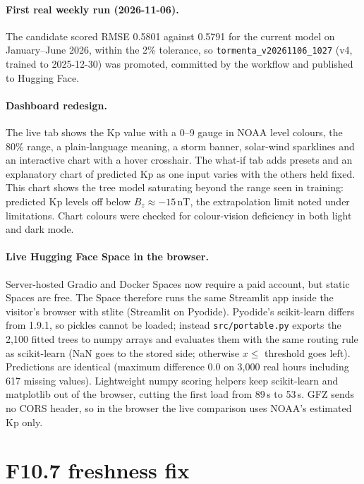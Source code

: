 \documentclass[11pt,a4paper]{article}
\newcommand{\code}[1]{\texttt{#1}}
\begin{document}
\paragraph{First real weekly run (2026-11-06).} The candidate scored RMSE 0.5801 against 0.5791 for the current
model on January--June 2026, within the 2\% tolerance, so \code{tormenta\_v20261106\_1027} (v4, trained to
2025-12-30) was promoted, committed by the workflow and published to Hugging Face.

\paragraph{Dashboard redesign.} The live tab shows the Kp value with a 0--9 gauge in NOAA level colours, the 80\%
range, a plain-language meaning, a storm banner, solar-wind sparklines and an interactive chart with a hover
crosshair. The what-if tab adds presets and an explanatory chart of predicted Kp as one input varies with the
others held fixed. This chart shows the tree model saturating beyond the range seen in training: predicted Kp
levels off below $B_z \approx -15$\,nT, the extrapolation limit noted under limitations. Chart colours were checked
for colour-vision deficiency in both light and dark mode.

\paragraph{Live Hugging Face Space in the browser.} Server-hosted Gradio and Docker Spaces now require a paid
account, but static Spaces are free. The Space therefore runs the same Streamlit app inside the visitor's browser
with stlite (Streamlit on Pyodide). Pyodide's scikit-learn differs from 1.9.1, so pickles cannot be loaded; instead
\code{src/portable.py} exports the 2{,}100 fitted trees to numpy arrays and evaluates them with the same routing
rule as scikit-learn (NaN goes to the stored side; otherwise $x \le$ threshold goes left). Predictions are identical
(maximum difference 0.0 on 3{,}000 real hours including 617 missing values). Lightweight numpy scoring helpers keep
scikit-learn and matplotlib out of the browser, cutting the first load from 89\,s to 53\,s. GFZ sends no CORS
header, so in the browser the live comparison uses NOAA's estimated Kp only.

\section{F10.7 freshness fix}\label{sec:f107fix}
\end{document}
